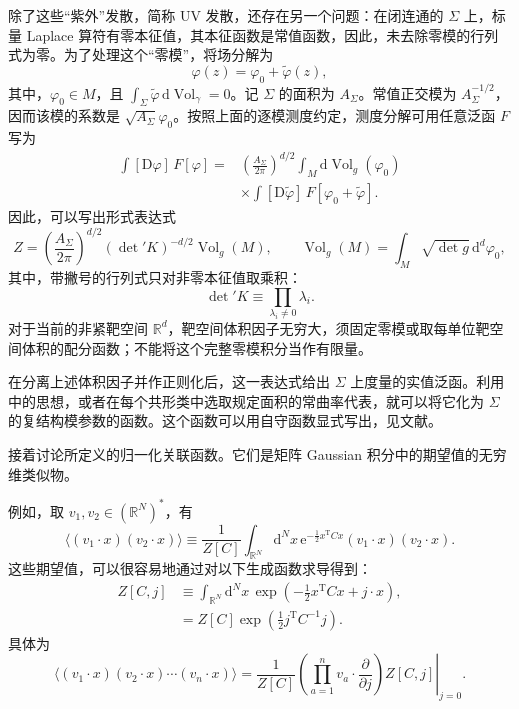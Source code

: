 除了这些“紫外”发散，简称 UV 发散，还存在另一个问题：在闭连通的 $\Sigma$ 上，标量 Laplace 算符有零本征值，其本征函数是常值函数，因此，未去除零模的行列式为零。为了处理这个“零模”，将场分解为
\begin{equation}\label{eq:3.38}
\varphi(z)=\varphi_0+\widetilde\varphi(z),
\end{equation}
其中，$\varphi_0\in M$，且 $\int_\Sigma\widetilde\varphi\,\mathrm{d}\operatorname{Vol}_\gamma=0$。记 $\Sigma$ 的面积为 $A_\Sigma$。常值正交模为 $A_\Sigma^{-1/2}$，因而该模的系数是 $\sqrt{A_\Sigma}\varphi_0$。按照上面的逐模测度约定，测度分解可用任意泛函 $F$ 写为
\begin{equation}\label{eq:3.39}
\begin{aligned}
\int[\mathrm{D}\varphi]\,F[\varphi]
={}&\left(\frac{A_\Sigma}{2\pi}\right)^{d/2}
\int_M\mathrm{d}\operatorname{Vol}_g(\varphi_0)\\
&\times\int[\mathrm{D}\widetilde\varphi]\,
F[\varphi_0+\widetilde\varphi].
\end{aligned}
\end{equation}
因此，可以写出形式表达式
\[
Z=\left(\frac{A_\Sigma}{2\pi}\right)^{d/2}
(\det{}'K)^{-d/2}\operatorname{Vol}_g(M),
\qquad
\operatorname{Vol}_g(M)=\int_M\sqrt{\det g}\,\mathrm{d}^d\varphi_0,
\]
其中，带撇号的行列式只对非零本征值取乘积：
\[
\det{}'K\equiv\prod_{\lambda_i\ne0}\lambda_i.
\]
对于当前的非紧靶空间 $\mathbb{R}^d$，靶空间体积因子无穷大，须固定零模或取每单位靶空间体积的配分函数；不能将这个完整零模积分当作有限量。

在分离上述体积因子并作正则化后，这一表达式给出 $\Sigma$ 上度量的实值泛函。利用中的思想，或者在每个共形类中选取规定面积的常曲率代表，就可以将它化为 $\Sigma$ 的复结构模参数的函数。这个函数可以用自守函数显式写出，见文献。

接着讨论所定义的归一化关联函数。它们是矩阵 Gaussian 积分中的期望值的无穷维类似物。
\begin{example*}
例如，取 $v_1,v_2\in(\mathbb{R}^N)^*$，有
\[
\langle(v_1\cdot x)(v_2\cdot x)\rangle
\equiv\frac1{Z[C]}\int_{\mathbb{R}^N}\mathrm{d}^Nx\,
\mathrm{e}^{-\frac12x^{\mathrm T}Cx}
(v_1\cdot x)(v_2\cdot x).
\]
这些期望值，可以很容易地通过对以下生成函数求导得到：
\begin{align}
Z[C,j]&\equiv\int_{\mathbb{R}^N}\mathrm{d}^Nx\,
\exp\left(-\frac12x^{\mathrm T}Cx+j\cdot x\right),
\label{eq:3.40}\\
&=Z[C]\exp\left(\frac12j^{\mathrm T}C^{-1}j\right).
\label{eq:3.41}
\end{align}
具体为
\begin{equation}\label{eq:3.42}
\langle(v_1\cdot x)(v_2\cdot x)\cdots(v_n\cdot x)\rangle
=\left.\frac1{Z[C]}
\left(\prod_{a=1}^n v_a\cdot\frac{\partial}{\partial j}\right)
Z[C,j]\right|_{j=0}.
\end{equation}
\end{example*}


